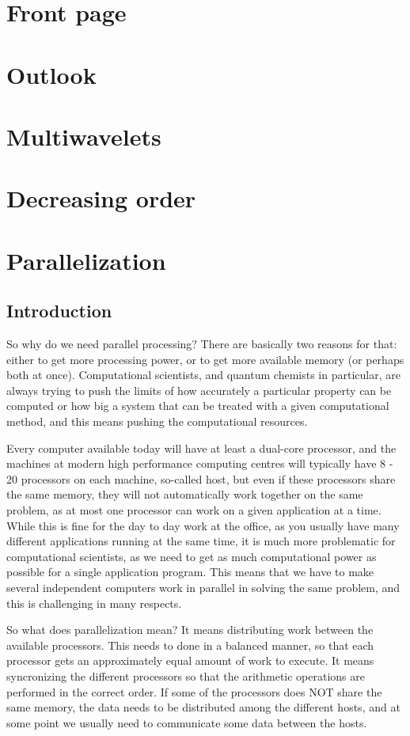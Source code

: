 \documentclass [a4paper]{report}
\begin{document}
\section*{Front page}
\section*{Outlook}
\section*{Multiwavelets}
\section*{Decreasing order}


\section*{Parallelization}

\subsection*{Introduction}
So why do we need parallel processing? There are basically two reasons for that: either to
get more processing power, or to get more available memory (or perhaps both at once). 
Computational scientists, and quantum chemists in particular, are always trying to push the 
limits of how accurately a particular property can be computed or how big a system that can 
be treated with a given computational method, and this means pushing the computational resources.

Every computer available today will have at least a dual-core processor, and the machines at
modern high performance computing centres will typically have 8 - 20 processors
on each machine, so-called host, but even if these processors share the same memory, they
will not automatically work together on the same problem, as at most one processor can 
work on a given application at a time. While this is fine for the day to day work at the 
office, as you usually have many different applications running at the same time, it is much 
more problematic for computational scientists, as we need to get as much computational power 
as possible for a single application program. This means that we have to make several 
independent computers work in parallel in solving the same problem, and this is challenging 
in many respects. 

So what does parallelization mean? It means distributing work between the available processors.
This needs to done in a balanced manner, so that each processor gets an approximately equal 
amount of work to execute. It means syncronizing the different processors so that the arithmetic
operations are performed in the correct order. If some of the processors does NOT share the same
memory, the data needs to be distributed among the different hosts, and at some point we usually
need to communicate some data between the hosts.
\end{document}
